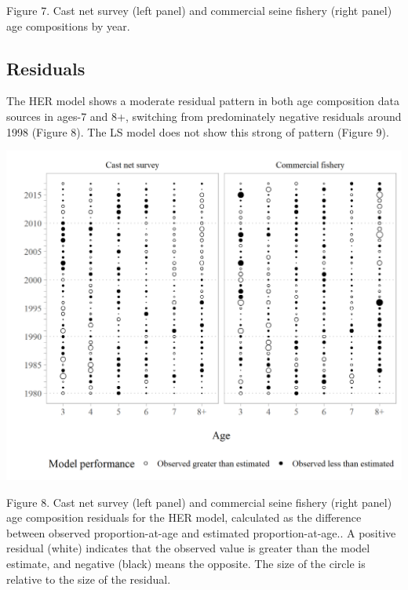 \documentclass[]{article}
\begin{document}
Figure 7. Cast net survey (left panel) and commercial seine fishery
(right panel) age compositions by year.

\subsection{Residuals}\label{residuals}

The HER model shows a moderate residual pattern in both age composition
data sources in ages-7 and 8+, switching from predominately negative
residuals around 1998 (Figure 8). The LS model does not show this strong
of pattern (Figure 9).

\includegraphics[width=1\linewidth]{../../HER/figs/HER/HER_agecomps_residplot}

Figure 8. Cast net survey (left panel) and commercial seine fishery
(right panel) age composition residuals for the HER model, calculated as
the difference between observed proportion-at-age and estimated
proportion-at-age.. A positive residual (white) indicates that the
observed value is greater than the model estimate, and negative (black)
means the opposite. The size of the circle is relative to the size of
the residual.
\end{document}
